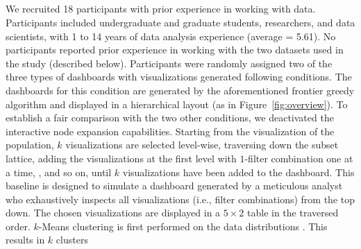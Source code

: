 \subsection{}
We recruited 18 participants 
with prior experience in working with data. 
Participants included undergraduate 
and graduate students, researchers, 
and data scientists, with 1 to 14 years of data 
analysis experience (average = 5.61). 
No participants reported prior experience 
in working with the two datasets used in the study (described below). 
Participants were randomly assigned two 
of the three types of dashboards with  
visualizations generated  
following conditions. 
\stitle{\system:} The dashboards for this condition 
are generated by the aforementioned 
frontier greedy algorithm and displayed 
in a hierarchical layout (as in Figure~\ref{fig:overview}). 
To establish a fair comparison 
with the two other conditions, 
we deactivated  
the interactive node expansion capabilities.
Starting from the visualization of the  population, 
$k$ visualizations are selected level-wise, 
traversing down the subset lattice, 
adding the visualizations at the first level 
with $1$-filter combination one at a time, 
, 
and so on, 
until $k$ visualizations have been added to the dashboard. 
This baseline is designed to simulate a dashboard 
generated by a meticulous analyst who exhaustively 
inspects all visualizations (i.e., filter combinations) 
from the top down. 
The chosen visualizations are displayed 
in a $5\times2$ table in the traversed order.
\stitle{\cluster:} 
$k$-Means clustering is first performed on the data distributions 
. 
This results in $k$ clusters 
